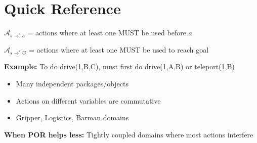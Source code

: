 \documentclass[11pt,a4paper]{article}
\begin{document}
\section{Quick Reference}

\begin{definitionbox}
$\mathcal{A}_{s \to^* a}$ = actions where at least one MUST be used before $a$

$\mathcal{A}_{s \to^* G}$ = actions where at least one MUST be used to reach goal

\textbf{Example:} To do drive(1,B,C), must first do drive(1,A,B) or teleport(1,B)
\end{definitionbox}

\begin{notebox}
\begin{itemize}[leftmargin=*,nosep]
\item Many independent packages/objects
\item Actions on different variables are commutative
\item Gripper, Logistics, Barman domains
\end{itemize}

\textbf{When POR helps less:} Tightly coupled domains where most actions interfere
\end{notebox}
\end{document}
